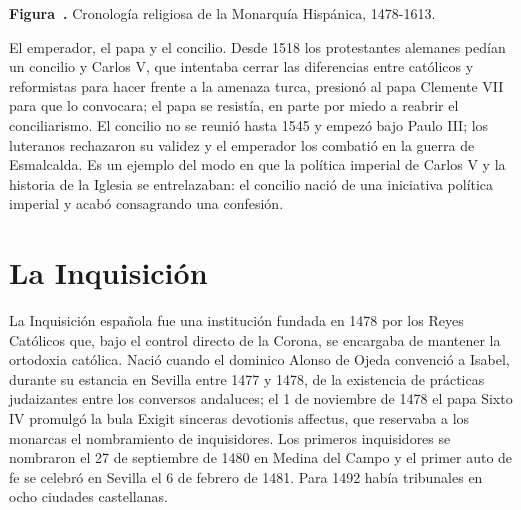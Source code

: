 \documentclass{book}
\newcounter{studiumfigure}
\begin{document}
\begin{minipage}{\linewidth}
%
\fi
\fi
\endgroup
\par\nopagebreak
{\small {}\label{fig:religion-cronologia}\textbf{Figura~\thestudiumfigure.} Cronología religiosa de la Monarquía Hispánica, 1478-1613.\par}
\end{minipage}
\par\vspace{\baselineskip}

El emperador, el papa y el concilio. Desde 1518 los protestantes alemanes pedían un concilio y Carlos V, que intentaba cerrar las diferencias entre católicos y reformistas para hacer frente a la amenaza turca, presionó al papa Clemente VII para que lo convocara; el papa se resistía, en parte por miedo a reabrir el conciliarismo. El concilio no se reunió hasta 1545 y empezó bajo Paulo III; los luteranos rechazaron su validez y el emperador los combatió en la guerra de Esmalcalda. Es un ejemplo del modo en que la política imperial de Carlos V y la historia de la Iglesia se entrelazaban: el concilio nació de una iniciativa política imperial y acabó consagrando una confesión.


\section{La Inquisición}

La Inquisición española fue una institución fundada en 1478 por los Reyes Católicos que, bajo el control directo de la Corona, se encargaba de mantener la ortodoxia católica. Nació cuando el dominico Alonso de Ojeda convenció a Isabel, durante su estancia en Sevilla entre 1477 y 1478, de la existencia de prácticas judaizantes entre los conversos andaluces; el 1 de noviembre de 1478 el papa Sixto IV promulgó la bula Exigit sinceras devotionis affectus, que reservaba a los monarcas el nombramiento de inquisidores. Los primeros inquisidores se nombraron el 27 de septiembre de 1480 en Medina del Campo y el primer auto de fe se celebró en Sevilla el 6 de febrero de 1481. Para 1492 había tribunales en ocho ciudades castellanas.
\end{document}
